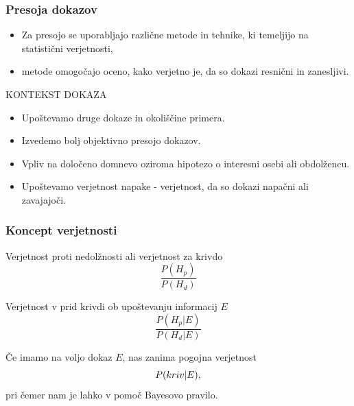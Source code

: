 \documentclass{beamer}
\begin{document}
\begin{frame}
    \frametitle{Presoja dokazov}
    \begin{itemize}
        \item Za presojo se uporabljajo različne metode in tehnike, ki temeljijo na statistični verjetnosti,
        \item metode omogočajo oceno, kako verjetno je, da so dokazi resnični in zanesljivi. 
    \end{itemize}
    \begin{beamerboxesrounded}[]{KONTEKST DOKAZA}
        \begin{itemize}
            \item Upoštevamo druge dokaze in okoliščine primera.
            \item Izvedemo bolj objektivno presojo dokazov.
            \item Vpliv na določeno domnevo oziroma hipotezo o interesni osebi ali obdolžencu.
            \item Upoštevamo verjetnost napake - verjetnost, da so dokazi napačni ali zavajajoči.
        \end{itemize} 
    \end{beamerboxesrounded}
\end{frame}

\begin{frame}
    \frametitle{Koncept verjetnosti}
    \begin{beamerboxesrounded}[]{Verjetnost proti nedolžnosti ali verjetnost za krivdo}
        \[
            \frac{P(H_p)}{P(H_d)}
        \]    
    \end{beamerboxesrounded} \vspace{3mm}
    \begin{beamerboxesrounded}[]{Verjetnost v prid krivdi ob upoštevanju informacij $E$}
        \[
            \frac{P(H_p \lvert E)}{P(H_d \lvert E)} 
        \]    
    \end{beamerboxesrounded} \vspace{5mm}
    Če imamo na voljo dokaz $E$, nas zanima pogojna verjetnost
    \[
        P(kriv \lvert E), \vspace{2mm}
    \]
    pri čemer nam je lahko v pomoč Bayesovo pravilo.
\end{frame}
\end{document}
